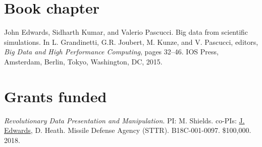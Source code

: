 \documentclass[margin,line]{res}
\begin{document}
\begin{resume}

\section{\sc Book chapter}

John Edwards, Sidharth Kumar, and Valerio Pascucci. Big data from scientific simulations. In L. Grandinetti, G.R. Joubert, M. Kunze, and V. Pascucci, editors, \textit{Big Data and High Performance Computing}, pages 32--46. IOS Press, Amsterdam, Berlin, Tokyo, Washington, DC, 2015.

%




\section{\sc Grants funded}
\textit{Revolutionary Data Presentation and Manipulation}. PI: M. Shields. co-PIs: \underline{J. Edwards}, D. Heath. Missile Defense Agency (STTR). B18C-001-0097. \$100,000. 2018.


\end{resume}
\end{document}
